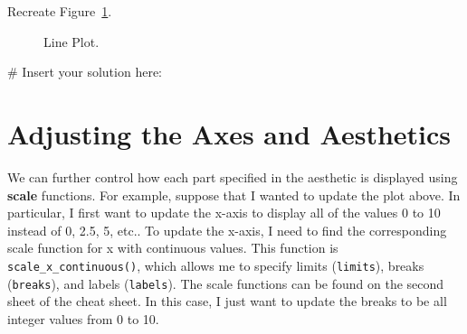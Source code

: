 \documentclass[
  letterpaper,
]{krantz}
\makeatletter
\newenvironment{Shaded}{\begin{snugshade}}{\end{snugshade}}
\newcommand{\CommentTok}[1]{\textcolor[rgb]{0.37,0.37,0.37}{#1}}
\newenvironment{kframe}{%
\medskip{}
\setlength{\fboxsep}{.8em}
 \def\at@end@of@kframe{}%
 \ifinner\ifhmode%
  \def\at@end@of@kframe{\end{minipage}}%
  \begin{minipage}{\columnwidth}%
 \fi\fi%
 \def\FrameCommand##1{\hskip\@totalleftmargin \hskip-\fboxsep
 \colorbox{shadecolor}{##1}\hskip-\fboxsep
     \hskip-\linewidth \hskip-\@totalleftmargin \hskip\columnwidth}%
 \MakeFramed {\advance\hsize-\width
   \@totalleftmargin\z@ \linewidth\hsize
   \@setminipage}}%
 {\par\unskip\endMakeFramed%
 \at@end@of@kframe}
\renewenvironment{Shaded}{\begin{kframe}}{\end{kframe}}
\makeatother
\begin{document}
Recreate Figure~\ref{fig-line-plot}.

\begin{figure}


\caption{\label{fig-line-plot}Line Plot.}

\end{figure}%

\begin{Shaded}
\begin{Highlighting}[]
\CommentTok{\# Insert your solution here: }
\end{Highlighting}
\end{Shaded}

\section{Adjusting the Axes and
Aesthetics}\label{adjusting-the-axes-and-aesthetics}

We can further control how each part specified in the aesthetic is
displayed using \textbf{scale} functions. For example, suppose that I
wanted to update the plot above. In particular, I first want to update
the x-axis to display all of the values 0 to 10 instead of 0, 2.5, 5,
etc.. To update the x-axis, I need to find the corresponding scale
function for x with continuous values. This function is
\texttt{scale\_x\_continuous()}, which allows me to specify limits
(\texttt{limits}), breaks (\texttt{breaks}), and labels
(\texttt{labels}). The scale functions can be found on the second sheet
of the cheat sheet. In this case, I just want to update the breaks to be
all integer values from 0 to 10.
\end{document}
